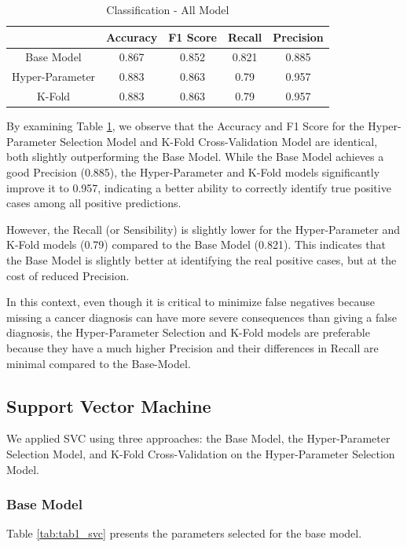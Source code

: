 \begin{table}[H]
    \centering
    \caption{Classification - All Model} 
    \begin{tabular}{||c| c c c c||} 
     \hline
     & Accuracy & F1 Score & Recall & Precision \\
     \hline\hline
     Base Model & 0.867 & 0.852 & 0.821 & 0.885 \\
     \hline
    Hyper-Parameter & 0.883 & 0.863 & 0.79 & 0.957 \\ 
    \hline
    K-Fold & 0.883 & 0.863 & 0.79 & 0.957 \\ 
    \hline
    \end{tabular}
    \label{tab:tab_LogReg}
\end{table}

By examining Table \ref{tab:tab_LogReg}, we observe that the Accuracy and F1 Score for the Hyper-Parameter Selection Model and K-Fold Cross-Validation Model are identical, both slightly outperforming the Base Model. While the Base Model achieves a good Precision (0.885), the Hyper-Parameter and K-Fold models significantly improve it to 0.957, indicating a better ability to correctly identify true positive cases among all positive predictions.

However, the Recall (or Sensibility) is slightly lower for the Hyper-Parameter and K-Fold models (0.79) compared to the Base Model (0.821). This indicates that the Base Model is slightly better at identifying the real positive cases, but at the cost of reduced Precision.

In this context, even though it is critical to minimize false negatives because missing a cancer diagnosis can have more severe consequences than giving a false diagnosis, the Hyper-Parameter Selection and K-Fold models are preferable because they have a much higher Precision and their differences in Recall are minimal compared to the Base-Model.

\bigskip
\subsection{Support Vector Machine}

We applied SVC using three approaches: the Base Model, the Hyper-Parameter Selection Model, and K-Fold Cross-Validation on the Hyper-Parameter Selection Model. 

\subsubsection{Base Model}
Table \ref{tab:tab1_svc} presents the parameters selected for the base model.

